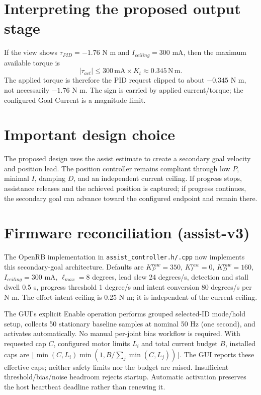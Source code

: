 \documentclass[11pt]{article}
\begin{document}
\section*{Interpreting the proposed output stage}
If the view shows $\tau_{PID}=-1.76$ N m and $I_{ceiling}=300$ mA, then the
maximum available torque is
\[
  |\tau_{act}| \le 300\,\mathrm{mA}\times K_t
  \approx 0.345\,\mathrm{N\,m}.
\]
The applied torque is therefore the PID request clipped to about $-0.345$ N m,
not necessarily $-1.76$ N m. The sign is carried by applied current/torque;
the configured Goal Current is a magnitude limit.

\section*{Important design choice}
The proposed design uses the assist estimate to create a secondary goal
velocity and position lead. The position controller remains compliant through
low $P$, minimal $I$, damping $D$, and an independent current ceiling. If
progress stops, assistance releases and the achieved position is captured;
if progress continues, the secondary goal can advance toward the configured
endpoint and remain there.

\section*{Firmware reconciliation (assist-v3)}
The OpenRB implementation in \texttt{assist\_controller.h/.cpp} now implements
this secondary-goal architecture. Defaults are $K_P^{raw}=350$,
$K_I^{raw}=0$, $K_D^{raw}=160$, $I_{ceiling}=300$ mA, $\ell_{max}=8$ degrees,
lead slew 24 degrees/s, detection and stall dwell 0.5 s, progress threshold
1 degree/s and intent conversion 80 degrees/s per N m. The effort-intent
ceiling is 0.25 N m; it is independent of the current ceiling.

The GUI's explicit Enable operation performs grouped selected-ID mode/hold
setup, collects 50 stationary baseline samples at nominal 50 Hz (one second),
and activates automatically. No manual per-joint bias workflow is required.
With requested cap $C$, configured motor limits $L_i$ and total current budget
$B$, installed caps are $\lfloor\min(C,L_i)\min(1,B/\sum_j\min(C,L_j))\rfloor$.
The GUI reports these effective caps; neither safety limits nor the budget are
raised. Insufficient threshold/bias/noise headroom rejects startup. Automatic
activation preserves the host heartbeat deadline rather than renewing it.
\end{document}
